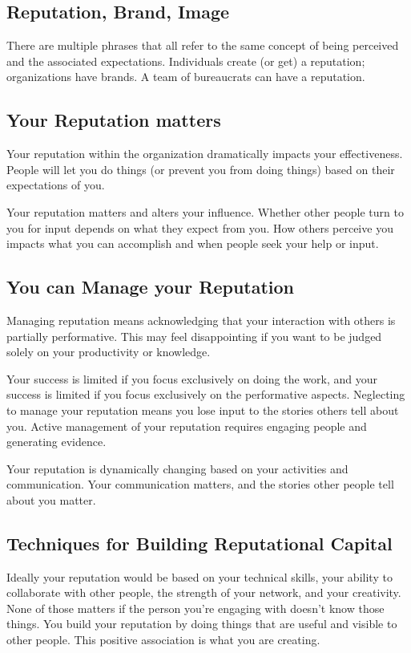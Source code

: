 \subsection*{Reputation, Brand, Image}

There are multiple phrases that all refer to the same concept of being perceived and the associated expectations. Individuals create (or get) a reputation; organizations have brands. A team of bureaucrats can have a reputation. 

\subsection*{Your Reputation matters}

Your reputation within the organization dramatically impacts your effectiveness. People will let you do things (or prevent you from doing things) based on their expectations of you. 

Your reputation matters and alters your influence. Whether other people turn to you for input depends on what they expect from you. How others perceive you impacts what you can accomplish and when people seek your help or input.

\subsection*{You can Manage your Reputation}

Managing reputation means acknowledging that your interaction with others is partially performative. This may feel disappointing if you want to be judged solely on your productivity or knowledge. 

Your success is limited if you focus exclusively on doing the work, and your success is limited if you focus exclusively on the performative aspects. 
Neglecting to manage your reputation means you lose input to the stories others tell about you. Active management of your reputation requires engaging people and generating evidence. 

Your reputation is dynamically changing based on your activities and communication. Your communication matters, and the stories other people tell about you matter.

\subsection*{Techniques for Building Reputational Capital}

Ideally your reputation would be based on your technical skills, your ability to collaborate with other people, the strength of your network, and your creativity. None of those matters if the person you're engaging with doesn't know those things. 
You build your reputation by doing things that are useful and visible to other people. This positive association is what you are creating.

